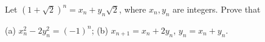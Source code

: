 Let $(1 + \sqrt{2})^n = x_n + y_n\sqrt{2}$, where $x_n, y_n$ are integers. Prove that

(a) $x_n^2 - 2y_n^2 = (-1)^n$; (b) $x_{n+1} = x_n + 2y_n$, $y_n = x_n + y_n$.
